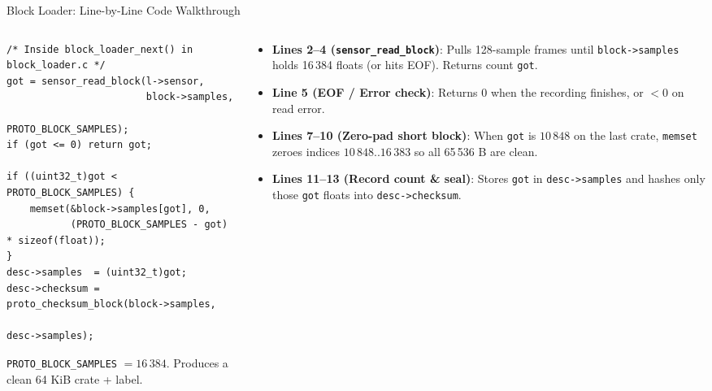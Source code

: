 \begin{frame}[fragile]{Block Loader: Line-by-Line Code Walkthrough}
  \begin{columns}[t, onlytextwidth]
    \begin{column}{0.52\textwidth}
\begin{lstlisting}
/* Inside block_loader_next() in block_loader.c */
got = sensor_read_block(l->sensor,
                        block->samples,
                        PROTO_BLOCK_SAMPLES);
if (got <= 0) return got;

if ((uint32_t)got < PROTO_BLOCK_SAMPLES) {
    memset(&block->samples[got], 0,
           (PROTO_BLOCK_SAMPLES - got) * sizeof(float));
}
desc->samples  = (uint32_t)got;
desc->checksum = proto_checksum_block(block->samples,
                                      desc->samples);
\end{lstlisting}
      {\scriptsize \texttt{PROTO\_BLOCK\_SAMPLES} $= 16\,384$. Produces a clean 64 KiB crate + label.}
    \end{column}
    \begin{column}{0.45\textwidth}
      \smalltext\compactitem
      \begin{itemize}
        \item \textbf{Lines 2--4 (\texttt{sensor\_read\_block})}: Pulls 128-sample frames until \texttt{block->samples} holds 16\,384 floats (or hits EOF). Returns count \texttt{got}.
        \item \textbf{Line 5 (EOF / Error check)}: Returns 0 when the recording finishes, or $<0$ on read error.
        \item \textbf{Lines 7--10 (Zero-pad short block)}: When \texttt{got} is $10\,848$ on the last crate, \texttt{memset} zeroes indices $10\,848..16\,383$ so all 65\,536 B are clean.
        \item \textbf{Lines 11--13 (Record count \& seal)}: Stores \texttt{got} in \texttt{desc->samples} and hashes only those \texttt{got} floats into \texttt{desc->checksum}.
      \end{itemize}
    \end{column}
  \end{columns}
\end{frame}

